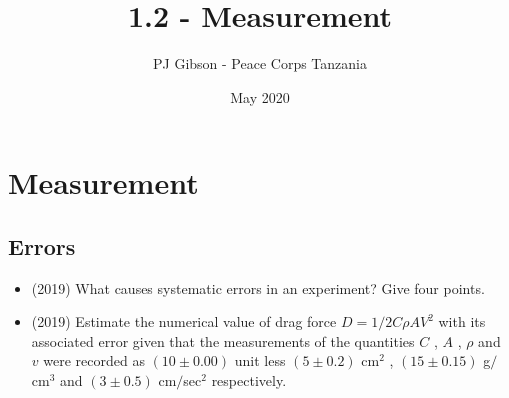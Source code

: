 \documentclass{article}
\title{1.2 - Measurement}
\author{PJ Gibson - Peace Corps Tanzania}
\date{May 2020}
\begin{document}
\maketitle


\section{Measurement}

\subsection{Errors}
\begin{itemize}
\item (2019)  What causes systematic errors in an experiment? Give four points. 
\item (2019)  Estimate the numerical value of drag force $ D= 1/2 C \rho  A V^{2}$ with its associated error given that the measurements of the quantities $ C$ , $ A$ , $ \rho $ and $ v$ were recorded as $ (10\pm 0.00)$ unit less $ (5\pm 0.2) $ cm$ ^{2}$ , $ (15\pm 0.15)$ g$/$cm$ ^{3}$ and $ (3\pm 0.5)$ cm$/$sec$ ^{2}$ respectively. 
\end{itemize}
\end{document}

